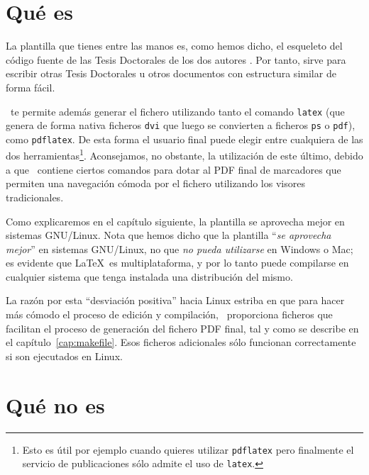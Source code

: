 \section{Qué es \texis}
\label{cap1:sec:que-es}

La plantilla que tienes entre las manos es, como hemos dicho, el
esqueleto del código fuente de las Tesis Doctorales de los dos autores
\citep{GomezMartinMA2008PhD, GomezMartinPP2008PhD}. Por tanto, sirve
para escribir otras Tesis Doctorales u otros documentos con estructura
similar de forma fácil.

\texis\ te permite además generar el fichero utilizando tanto el
comando \texttt{latex} (que genera de forma nativa ficheros
\texttt{dvi} que luego se convierten a ficheros \texttt{ps} o
\texttt{pdf}), como \texttt{pdflatex}. De esta forma el usuario final
puede elegir entre cualquiera de las dos herramientas\footnote{Esto es
  útil por ejemplo cuando quieres utilizar \texttt{pdflatex} pero
  finalmente el servicio de publicaciones sólo admite el uso de
  \texttt{latex}.}.  Aconsejamos, no obstante, la utilización de este
último, debido a que \texis\ contiene ciertos comandos para dotar al
PDF final de marcadores que permiten una navegación cómoda por el
fichero utilizando los visores tradicionales.

\medskip

Como explicaremos en el capítulo siguiente, la plantilla se aprovecha
mejor en sistemas GNU/Linux. Nota que hemos dicho que la plantilla
``\emph{se aprovecha mejor}'' en sistemas GNU/Linux, no que \emph{no
pueda utilizarse} en Windows o Mac; es evidente que \LaTeX\ es
multiplataforma, y por lo tanto puede compilarse en cualquier sistema
que tenga instalada una distribución del mismo.

La razón por esta ``desviación positiva'' hacia Linux estriba en que
para hacer más cómodo el proceso de edición y compilación, \texis\
proporciona ficheros que facilitan el proceso de generación del
fichero PDF final, tal y como se describe en el
capítulo~\ref{cap:makefile}.  Esos ficheros adicionales sólo funcionan
correctamente si son ejecutados en Linux.

\section{Qué no es}
\label{cap1:sec:que-no-es}

